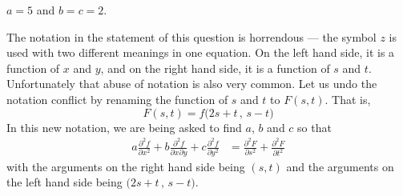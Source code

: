 \begin{answer}
$a=5$ and $b=c=2$.
\end{answer}

\begin{solution}
The notation in the statement of this question is horrendous --- 
the symbol $z$ is used with two different meanings in one equation.
On the left hand side, it is a function of $x$ and $y$, 
and on the right hand side, it is a function of $s$ and $t$.  
Unfortunately that abuse of notation is also very common. 
Let us undo the notation conflict by renaming the function of $s$ and $t$ 
to $F(s,t)$. That is,
\begin{equation*}
F(s,t) = f\big(2s+t\,,\,s-t\big)
\end{equation*}
In this new notation, we are being asked to find $a$, $b$ and $c$ so that 
\begin{align*}
a\frac{\partial^2 f}{\partial x^2}
 +b\frac{\partial^2 f}{\partial x\partial y}
 +c\frac{\partial^2 f}{\partial y^2}
&=\frac{\partial^2 F}{\partial s^2} + \frac{\partial^2 F}{\partial t^2}
\end{align*}
with the arguments on the right hand side being $(s,t)$ and the
arguments on the left hand side being $\big(2s+t\,,\,s-t\big)$.


\end{solution}

